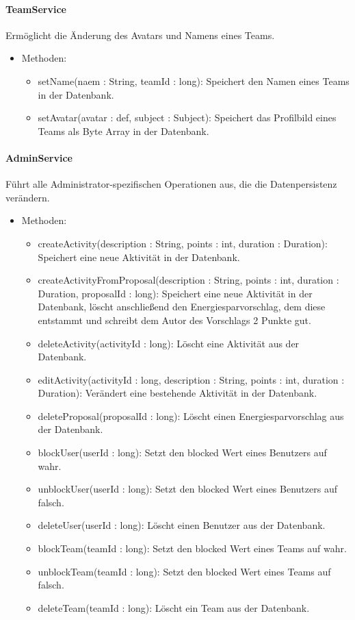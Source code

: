 	\paragraph{TeamService}Erm\"oglicht die \"Anderung des Avatars und Namens eines Teams.
		\begin{itemize}
			\item Methoden:
			\begin{itemize}
				\item setName(naem : String, teamId : long): Speichert den Namen eines Teams in der Datenbank.
				\item setAvatar(avatar : def, subject : Subject): Speichert das Profilbild eines Teams als Byte Array in der Datenbank.
			\end{itemize}
		\end{itemize}
	\paragraph{AdminService}F\"uhrt alle Administrator-spezifischen Operationen aus, die die Datenpersistenz ver\"andern.
		\begin{itemize}
			\item Methoden:
			\begin{itemize}
				\item createActivity(description : String, points : int, duration : Duration): Speichert eine neue Aktivit\"at in der Datenbank.
				\item createActivityFromProposal(description : String, points : int, duration : Duration, proposalId : long): Speichert eine neue Aktivit\"at in der Datenbank, l\"oscht anschließend den Energiesparvorschlag, dem diese entstammt und schreibt dem Autor des Vorschlags 2 Punkte gut.
				\item deleteActivity(activityId : long): L\"oscht eine Aktivit\"at aus der Datenbank.
				\item editActivity(activityId : long, description : String, points : int, duration : Duration): Ver\"andert eine bestehende Aktivit\"at in der Datenbank.
				\item deleteProposal(proposalId : long): L\"oscht einen Energiesparvorschlag aus der Datenbank.
				\item blockUser(userId : long): Setzt den blocked Wert eines Benutzers auf wahr.
				\item unblockUser(userId : long): Setzt den blocked Wert eines Benutzers auf falsch.
				\item deleteUser(userId : long): L\"oscht einen Benutzer aus der Datenbank.
				\item blockTeam(teamId : long): Setzt den blocked Wert eines Teams auf wahr.
				\item unblockTeam(teamId : long): Setzt den blocked Wert eines Teams auf falsch.
				\item deleteTeam(teamId : long): L\"oscht ein Team aus der Datenbank.
			\end{itemize}
		\end{itemize}
